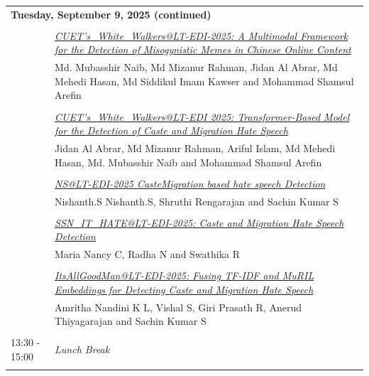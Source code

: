 \documentclass[11pt,oneside]{book}
\begin{document}
    \begin{tabular}{p{24mm}p{124mm}}
    \multicolumn{2}{l}{\bf Tuesday, September 9, 2025 (continued)} \\\\
          
                      & \hyperlink{page.68}{\emph{CUET's\_White\_Walkers@LT-EDI-2025: A Multimodal Framework for the Detection of Misogynistic Memes in Chinese Online Content}}\\
        & Md. Mubasshir Naib\index{Naib}, Md Mizanur Rahman\index{Rahman}, Jidan Al Abrar\index{Abrar}, Md Mehedi Hasan\index{Hasan}, Md Siddikul Imam Kawser\index{Kawser} and Mohammad Shamsul Arefin\index{Arefin}\\\\
                
                      & \hyperlink{page.75}{\emph{CUET's\_White\_Walkers@LT-EDI 2025: Transformer-Based Model for the Detection of Caste and Migration Hate Speech}}\\
        & Jidan Al Abrar\index{Abrar}, Md Mizanur Rahman\index{Rahman}, Ariful Islam\index{Islam}, Md Mehedi Hasan\index{Hasan}, Md. Mubasshir Naib\index{Naib} and Mohammad Shamsul Arefin\index{Arefin}\\\\
                
                      & \hyperlink{page.80}{\emph{NS@LT-EDI-2025 CasteMigration based hate speech Detection}}\\
        & Nishanth.S Nishanth.S\index{Nishanth.S}, Shruthi Rengarajan\index{Rengarajan} and Sachin Kumar S\index{S}\\\\
                
                      & \hyperlink{page.84}{\emph{SSN\_IT\_HATE@LT-EDI-2025: Caste and Migration Hate Speech Detection}}\\
        & Maria Nancy C\index{C}, Radha N\index{N} and Swathika R\index{R}\\\\
                
                      & \hyperlink{page.90}{\emph{ItsAllGoodMan@LT-EDI-2025: Fusing TF-IDF and MuRIL Embeddings for Detecting Caste and Migration Hate Speech}}\\
        & Amritha Nandini K L\index{L}, Vishal S\index{S}, Giri Prasath R\index{R}, Anerud Thiyagarajan\index{Thiyagarajan} and Sachin Kumar S\index{S}\\\\
                        13:30 - 15:00 & \emph{Lunch Break}\\\\
      

\end{tabular}
\end{document}
